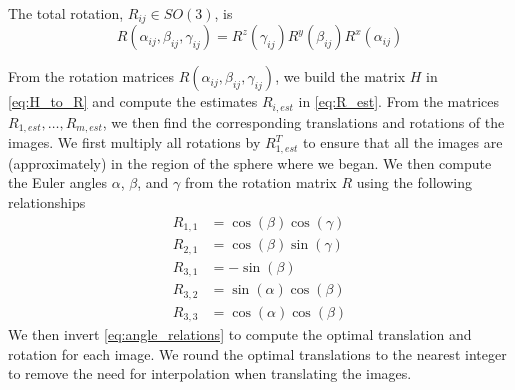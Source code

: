 \documentclass{pnastwo}
\begin{document}
\begin{article}
\begin{materials}
%
The total rotation, $R_{ij} \in SO(3)$, is 
\begin{equation} \label{eq:total_rot}
	R(\alpha_{ij}, \beta_{ij}, \gamma_{ij})	 = R^z(\gamma_{ij})  R^y(\beta_{ij})  R^x(\alpha_{ij})
\end{equation}
%

From the rotation matrices $R(\alpha_{ij}, \beta_{ij}, \gamma_{ij})$,
we build the matrix $H$ in \eqref{eq:H_to_R} and compute the estimates $R_{i, est}$ in \eqref{eq:R_est}.
%
From the matrices $R_{1, est}, \dots, R_{m, est}$, we then find the corresponding translations and rotations of the images.
%
We first multiply all rotations by $R_{1, est}^T$ to ensure that all the images are (approximately) in the region of the sphere where we began.
%
We then compute the Euler angles $\alpha$, $\beta$, and $\gamma$ from the rotation matrix $R$ using the following relationships
\begin{equation}
\begin{aligned}
R_{1,1} & = \cos(\beta)\cos(\gamma) \\
R_{2,1} & = \cos(\beta)\sin(\gamma) \\
R_{3,1} & = -\sin(\beta) \\
R_{3,2} & = \sin(\alpha)\cos(\beta) \\
R_{3,3} & = \cos(\alpha)\cos(\beta) 
\end{aligned}
\end{equation}
%
We then invert \eqref{eq:angle_relations} to compute the optimal translation and rotation for each image.
%
We round the optimal translations to the nearest integer to remove the need for interpolation when translating the images.  


\end{materials}
\end{article}
\end{document}
